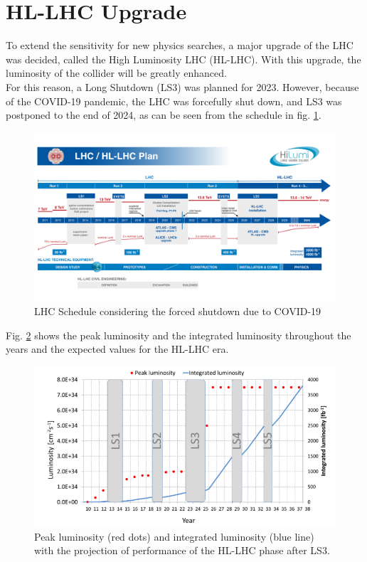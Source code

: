 \section{HL-LHC Upgrade}
\label{sec:HL-LHC}
To extend the sensitivity for new physics searches, a major upgrade of the LHC was decided, called the High Luminosity LHC (HL-LHC). With this upgrade, the luminosity of the collider will be greatly enhanced. \\
For this reason, a Long Shutdown (LS3) was planned for 2023. However, because of the COVID-19 pandemic, the LHC was forcefully shut down, and LS3 was postponed to the end of 2024, as can be seen from the schedule in fig. \ref{lhc_schedule}.
\begin{figure}
    \centering
    \includegraphics[width = \linewidth]{images/lhc_schedule.png}
    \caption{LHC Schedule considering the forced shutdown due to COVID-19}
    \label{lhc_schedule}
\end{figure}
Fig. \ref{hl_lumi} shows the peak luminosity and the integrated luminosity throughout the years and the expected values for the HL-LHC era.
\begin{figure}
    \centering
    \includegraphics[width = \linewidth]{images/hl_lumi.png}
    \caption{Peak luminosity (red dots) and integrated luminosity (blue line) with the projection of performance of the HL-LHC phase after LS3.}
    \label{hl_lumi}
\end{figure}
